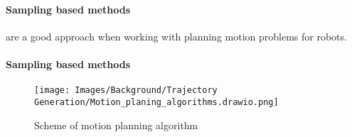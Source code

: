 \paragraph{Sampling based methods} are a good approach when working with planning motion problems for robots. 



\paragraph{Sampling based methods}

\begin{figure}[H]
    \centering
    \texttt{[image: Images/Background/Trajectory Generation/Motion\_planing\_algorithms.drawio.png]}
    \caption{Scheme of motion planning algorithm}
    \label{fig:background:trajectory generation:motion planning algorithms}
\end{figure}

